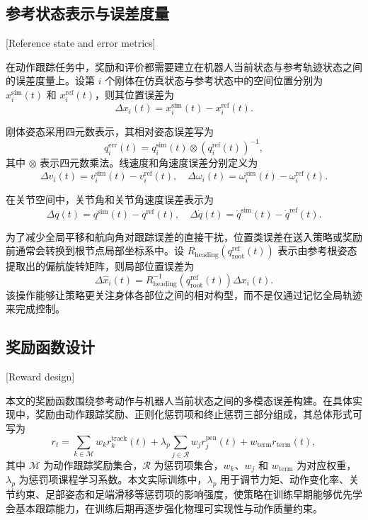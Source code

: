 \subsection{参考状态表示与误差度量}[Reference state and error metrics]

在动作跟踪任务中，奖励和评价都需要建立在机器人当前状态与参考轨迹状态之间的误差度量上。设第 $i$ 个刚体在仿真状态与参考状态中的空间位置分别为 $x_i^{\mathrm{sim}}(t)$ 和 $x_i^{\mathrm{ref}}(t)$，则其位置误差为
\begin{equation}
\Delta x_i(t)
=
x_i^{\mathrm{sim}}(t)-x_i^{\mathrm{ref}}(t).
\end{equation}

刚体姿态采用四元数表示，其相对姿态误差写为
\begin{equation}
q_i^{\mathrm{err}}(t)
=
q_i^{\mathrm{sim}}(t)\otimes
\left(q_i^{\mathrm{ref}}(t)\right)^{-1},
\end{equation}
其中 $\otimes$ 表示四元数乘法。线速度和角速度误差分别定义为
\begin{equation}
\Delta v_i(t)=v_i^{\mathrm{sim}}(t)-v_i^{\mathrm{ref}}(t),
\quad
\Delta \omega_i(t)=\omega_i^{\mathrm{sim}}(t)-\omega_i^{\mathrm{ref}}(t).
\end{equation}

在关节空间中，关节角和关节角速度误差表示为
\begin{equation}
\Delta q(t)=q^{\mathrm{sim}}(t)-q^{\mathrm{ref}}(t),
\quad
\Delta \dot{q}(t)=\dot{q}^{\mathrm{sim}}(t)-\dot{q}^{\mathrm{ref}}(t).
\end{equation}

为了减少全局平移和航向角对跟踪误差的直接干扰，位置类误差在送入策略或奖励前通常会转换到根节点局部坐标系中。设 $R_{\mathrm{heading}}(q_{\mathrm{root}}^{\mathrm{ref}}(t))$ 表示由参考根姿态提取出的偏航旋转矩阵，则局部位置误差为
\begin{equation}
\Delta \hat{x}_i(t)
=
R_{\mathrm{heading}}^{-1}
\left(q_{\mathrm{root}}^{\mathrm{ref}}(t)\right)
\Delta x_i(t).
\end{equation}
该操作能够让策略更关注身体各部位之间的相对构型，而不是仅通过记忆全局轨迹来完成控制。

\subsection{奖励函数设计}[Reward design]

本文的奖励函数围绕参考动作与机器人当前状态之间的多模态误差构建。在具体实现中，奖励由动作跟踪奖励、正则化惩罚项和终止惩罚三部分组成，其总体形式可写为
\begin{equation}
r_t
=
\sum_{k\in\mathcal{M}} w_k r_k^{\mathrm{track}}(t)
+
\lambda_p
\sum_{j\in\mathcal{R}} w_j r_j^{\mathrm{pen}}(t)
+
w_{\mathrm{term}} r_{\mathrm{term}}(t),
\label{eq:reward_total}
\end{equation}
其中 $\mathcal{M}$ 为动作跟踪奖励集合，$\mathcal{R}$ 为惩罚项集合，$w_k$、$w_j$ 和 $w_{\mathrm{term}}$ 为对应权重，$\lambda_p$ 为惩罚项课程学习系数。本文实际训练中，$\lambda_p$ 用于调节力矩、动作变化率、关节约束、足部姿态和足端滑移等惩罚项的影响强度，使策略在训练早期能够优先学会基本跟踪能力，在训练后期再逐步强化物理可实现性与动作质量约束。

